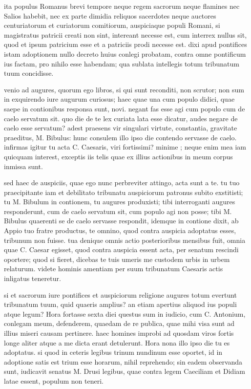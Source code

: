  ita populus Romanus brevi tempore neque regem sacrorum neque flamines nec Salios habebit, nec ex parte dimidia reliquos sacerdotes neque auctores centuriatorum et curiatorum comitiorum, auspiciaque populi Romani, si magistratus patricii creati non sint, intereant necesse est, cum interrex nullus sit, quod et ipsum patricium esse et a patriciis prodi necesse est. dixi apud pontifices istam adoptionem nullo decreto huius conlegi probatam, contra omne pontificum ius factam, pro nihilo esse habendam; qua sublata intellegis totum tribunatum tuum concidisse.

 venio ad augures, quorum ego libros, si qui sunt reconditi, non scrutor; non sum in exquirendo iure augurum curiosus; haec quae una cum populo didici, quae saepe in contionibus responsa sunt, novi. negant fas esse agi cum populo cum de caelo servatum sit. quo die de te lex curiata lata esse dicatur, audes negare de caelo esse servatum? adest praesens vir singulari virtute, constantia, gravitate praeditus, M. Bibulus: hunc consulem illo ipso die contendo servasse de caelo. infirmas igitur tu acta C. Caesaris, viri fortissimi? minime ; neque enim mea iam quicquam interest, exceptis iis telis quae ex illius actionibus in meum corpus inmissa sunt.

 sed haec de auspiciis, quae ego nunc perbreviter attingo, acta sunt a te. tu tuo praecipitante iam et debilitato tribunatu auspiciorum patronus subito exstitisti; tu M. Bibulum in contionem, tu augures produxisti; tibi interroganti augures responderunt, cum de caelo servatum sit, cum populo agi non posse; tibi M. Bibulus quaerenti se de caelo servasse respondit, idemque in contione dixit, ab Appio tuo fratre productus, te omnino, quod contra auspicia adoptatus esses, tribunum non fuisse. tua denique omnis actio posterioribus mensibus fuit, omnia quae C. Caesar egisset, quod contra auspicia essent acta, per senatum rescindi oportere; quod si fieret, dicebas te tuis umeris me custodem urbis in urbem relaturum. videte hominis amentiam per suum tribunatum Caesaris actis inligatus teneretur.

 si et sacrorum iure pontifices et auspiciorum religione augures totum evertunt tribunatum tuum, quid quaeris amplius? an etiam apertius aliquod ius populi atque legum? Hora fortasse sexta diei questus sum in iudicio, cum C. Antonium, conlegam meum, defenderem, quaedam de re publica, quae mihi visa sunt ad illius miseri causam pertinere. haec homines improbi ad quosdam viros fortis longe aliter atque a me dicta erant detulerunt. Hora nona illo ipso die tu es adoptatus. si quod in ceteris legibus trinum nundinum esse oportet, id in adoptione satis est trium esse horarum, nihil reprehendo; sin eadem observanda sunt, iudicavit senatus M. Drusi legibus, quae contra legem Caeciliam et Didiam latae essent, populum non teneri.

